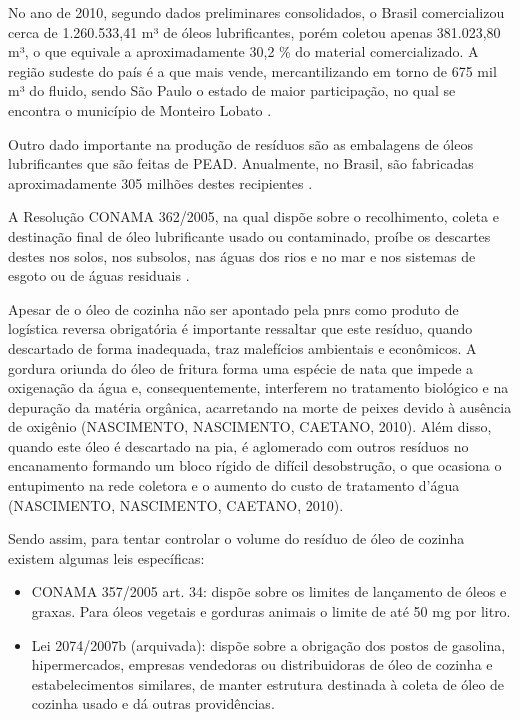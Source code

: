 \begin{description}
	No ano de 2010, segundo dados preliminares consolidados, o Brasil comercializou cerca de 1.260.533,41 m³ de óleos lubrificantes, porém coletou apenas 381.023,80 m³, o que equivale a aproximadamente 30,2 \% do material comercializado. A região sudeste do país é a que mais vende, mercantilizando em torno de 675 mil m³ do fluido, sendo São Paulo o estado de maior participação, no qual se encontra o município de Monteiro Lobato \cite{IPEA2012d}. 
	
	Outro dado importante na produção de resíduos são as embalagens de óleos lubrificantes que são feitas de PEAD. Anualmente, no Brasil, são fabricadas aproximadamente 305 milhões destes recipientes \cite{IPEA2012d}.
	
	A Resolução CONAMA 362/2005, na qual dispõe sobre o recolhimento, coleta e destinação final de óleo lubrificante usado ou contaminado, proíbe os descartes destes nos solos, nos subsolos, nas águas dos rios e no mar e nos sistemas de esgoto ou de águas residuais \cite{conama:362}.
	
	Apesar de o óleo de cozinha não ser apontado pela \gls{pnrs} como produto de logística reversa obrigatória é importante ressaltar que este resíduo, quando descartado de forma inadequada, traz malefícios ambientais e econômicos. A gordura oriunda do óleo de fritura forma uma espécie de nata que impede a oxigenação da água e, consequentemente, interferem no tratamento biológico e na depuração da matéria orgânica, acarretando na morte de peixes devido à ausência de oxigênio (NASCIMENTO, NASCIMENTO, CAETANO, 2010). Além disso, quando este óleo é descartado na pia, é aglomerado com outros resíduos no encanamento formando um bloco rígido de difícil desobstrução, o que ocasiona o entupimento na rede coletora e o aumento do custo de tratamento d’água (NASCIMENTO, NASCIMENTO, CAETANO, 2010). 
	
	Sendo assim, para tentar controlar o volume do resíduo de óleo de cozinha existem algumas leis específicas: 
	
	\begin{itemize}
		\item CONAMA 357/2005 art. 34: dispõe sobre os limites de lançamento de óleos e graxas. Para óleos vegetais e gorduras animais o limite de até 50 mg por litro.
		\item Lei 2074/2007b (arquivada): dispõe sobre a obrigação dos postos de gasolina, hipermercados, empresas vendedoras ou distribuidoras de óleo de cozinha e estabelecimentos similares, de manter estrutura destinada à coleta de óleo de cozinha usado e dá outras providências. 
	\end{itemize}
	

\end{description}
